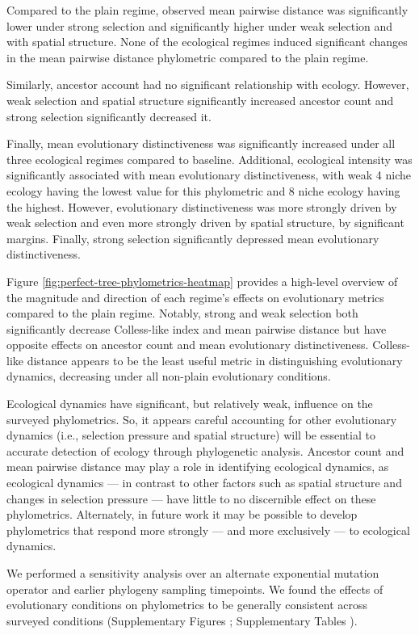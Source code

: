 Compared to the plain regime, observed mean pairwise distance was significantly lower under strong selection and significantly higher under weak selection and with spatial structure.
None of the ecological regimes induced significant changes in the mean pairwise distance phylometric compared to the plain regime.

Similarly, ancestor account had no significant relationship with ecology.
However, weak selection and spatial structure significantly increased ancestor count and strong selection significantly decreased it.

Finally, mean evolutionary distinctiveness was significantly increased under all three ecological regimes compared to baseline.
Additional, ecological intensity was significantly associated with mean evolutionary distinctiveness, with weak 4 niche ecology having the lowest value for this phylometric and 8 niche ecology having the highest.
However, evolutionary distinctiveness was more strongly driven by weak selection and even more strongly driven by spatial structure, by significant margins.
Finally, strong selection significantly depressed mean evolutionary distinctiveness.

Figure \ref{fig:perfect-tree-phylometrics-heatmap} provides a high-level overview of the magnitude and direction of each regime's effects on evolutionary metrics compared to the plain regime.
Notably, strong and weak selection both significantly decrease Colless-like index and mean pairwise distance but have opposite effects on ancestor count and mean evolutionary distinctiveness.
Colless-like distance appears to be the least useful metric in distinguishing evolutionary dynamics, decreasing under all non-plain evolutionary conditions.

Ecological dynamics have significant, but relatively weak, influence on the surveyed phylometrics.
So, it appears careful accounting for other evolutionary dynamics (i.e., selection pressure and spatial structure) will be essential to accurate detection of ecology through phylogenetic analysis.
Ancestor count and mean pairwise distance may play a role in identifying ecological dynamics, as ecological dynamics --- in contrast to other factors such as spatial structure and changes in selection pressure --- have little to no discernible effect on these phylometrics.
Alternately, in future work it may be possible to develop phylometrics that respond more strongly --- and more exclusively --- to ecological dynamics.

We performed a sensitivity analysis over an alternate exponential mutation operator and earlier phylogeny sampling timepoints.
We found the effects of evolutionary conditions on phylometrics to be generally consistent across surveyed conditions (Supplementary Figures ; Supplementary Tables ).

